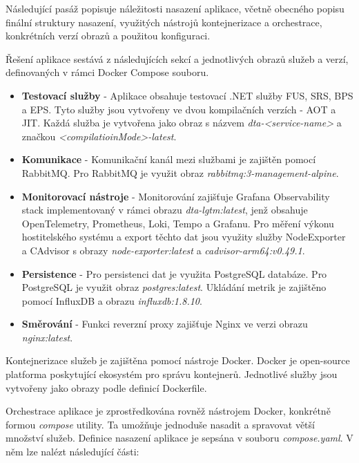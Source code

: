 
Následující pasáž popisuje náležitosti nasazení aplikace, včetně obecného popisu finální struktury nasazení, využitých nástrojů kontejnerizace a orchestrace, konkrétních verzí obrazů a použitou konfiguraci.


Řešení aplikace sestává z následujících sekcí a jednotlivých obrazů služeb a verzí, definovaných v rámci Docker Compose souboru.

\begin{itemize}
    \item \textbf{Testovací služby} - Aplikace obsahuje testovací .NET služby FUS, SRS, BPS a EPS. Tyto služby jsou vytvořeny ve dvou kompilačních verzích - AOT a JIT. Každá služba je vytvořena jako obraz s názvem \emph{dta-<service-name>} a značkou \emph{<compilatioinMode>-latest}.
    \item \textbf{Komunikace} - Komunikační kanál mezi službami je zajištěn pomocí RabbitMQ. Pro RabbitMQ je využit obraz \emph{rabbitmq:3-management-alpine}.
    \item \textbf{Monitorovací nástroje} - Monitorování zajišťuje Grafana Observability stack implementovaný v rámci obrazu \emph{dta-lgtm:latest}, jenž obsahuje OpenTelemetry, Prometheus, Loki, Tempo a Grafanu. Pro měření výkonu hostitelského systému a export těchto dat jsou využity služby NodeExporter a CAdvisor s obrazy \emph{node-exporter:latest} a \emph{cadvisor-arm64:v0.49.1}.
    \item \textbf{Persistence} - Pro persistenci dat je využita PostgreSQL databáze. Pro PostgreSQL je využit obraz \emph{postgres:latest}. Ukládání metrik je zajištěno pomocí InfluxDB a obrazu \emph{influxdb:1.8.10}.
    \item \textbf{Směrování} - Funkci reverzní proxy zajišťuje Nginx ve verzi obrazu \emph{nginx:latest}.
\end{itemize}



Kontejnerizace služeb je zajištěna pomocí nástroje Docker. Docker je open-source platforma poskytující ekosystém pro správu kontejnerů. Jednotlivé služby jsou vytvořeny jako obrazy podle definicí Dockerfile. 

Orchestrace aplikace je zprostředkována rovněž nástrojem Docker, konkrétně formou \emph{compose} utility. Ta umožňuje jednoduše nasadit a spravovat větší množství služeb. Definice nasazení aplikace je sepsána v souboru \emph{compose.yaml}. V něm lze nalézt následující části:

